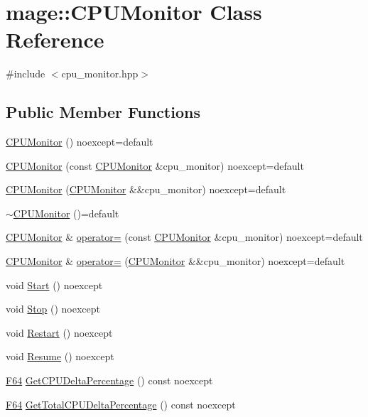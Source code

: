 \hypertarget{classmage_1_1_c_p_u_monitor}{}\section{mage\+:\+:C\+P\+U\+Monitor Class Reference}
\label{classmage_1_1_c_p_u_monitor}


{\ttfamily \#include $<$cpu\+\_\+monitor.\+hpp$>$}

\subsection*{Public Member Functions}
\begin{DoxyCompactItemize}
\item 
\hyperlink{classmage_1_1_c_p_u_monitor_ad41542b831ae42cf8dbb206a70535598}{C\+P\+U\+Monitor} () noexcept=default
\item 
\hyperlink{classmage_1_1_c_p_u_monitor_a8d53a4b373c63d074fcb0cb969b3f7cb}{C\+P\+U\+Monitor} (const \hyperlink{classmage_1_1_c_p_u_monitor}{C\+P\+U\+Monitor} \&cpu\+\_\+monitor) noexcept=default
\item 
\hyperlink{classmage_1_1_c_p_u_monitor_a415f77c86323428f233f955249f5b252}{C\+P\+U\+Monitor} (\hyperlink{classmage_1_1_c_p_u_monitor}{C\+P\+U\+Monitor} \&\&cpu\+\_\+monitor) noexcept=default
\item 
\hyperlink{classmage_1_1_c_p_u_monitor_a597ea4b27675a22d3d66a1d817b26652}{$\sim$\+C\+P\+U\+Monitor} ()=default
\item 
\hyperlink{classmage_1_1_c_p_u_monitor}{C\+P\+U\+Monitor} \& \hyperlink{classmage_1_1_c_p_u_monitor_a878cc9fd170e6c34ee28f06591b06eeb}{operator=} (const \hyperlink{classmage_1_1_c_p_u_monitor}{C\+P\+U\+Monitor} \&cpu\+\_\+monitor) noexcept=default
\item 
\hyperlink{classmage_1_1_c_p_u_monitor}{C\+P\+U\+Monitor} \& \hyperlink{classmage_1_1_c_p_u_monitor_af1eacba414b2db72cf13d335f78785cd}{operator=} (\hyperlink{classmage_1_1_c_p_u_monitor}{C\+P\+U\+Monitor} \&\&cpu\+\_\+monitor) noexcept=default
\item 
void \hyperlink{classmage_1_1_c_p_u_monitor_a3f88acbb979f47309fd46f1b507fed09}{Start} () noexcept
\item 
void \hyperlink{classmage_1_1_c_p_u_monitor_a133aaed1df0e84486a6fc748d66615bb}{Stop} () noexcept
\item 
void \hyperlink{classmage_1_1_c_p_u_monitor_ab8b04a64545df631be0f40a54cc49e03}{Restart} () noexcept
\item 
void \hyperlink{classmage_1_1_c_p_u_monitor_a5fd594262dc1073da564955c58851760}{Resume} () noexcept
\item 
\hyperlink{namespacemage_ad26233bbec640deda836e572c1a23708}{F64} \hyperlink{classmage_1_1_c_p_u_monitor_a67a4eba9480d15855f6283ec434c215a}{Get\+C\+P\+U\+Delta\+Percentage} () const noexcept
\item 
\hyperlink{namespacemage_ad26233bbec640deda836e572c1a23708}{F64} \hyperlink{classmage_1_1_c_p_u_monitor_aec7712bcef92b93d368c312168ab56bd}{Get\+Total\+C\+P\+U\+Delta\+Percentage} () const noexcept
\end{DoxyCompactItemize}
